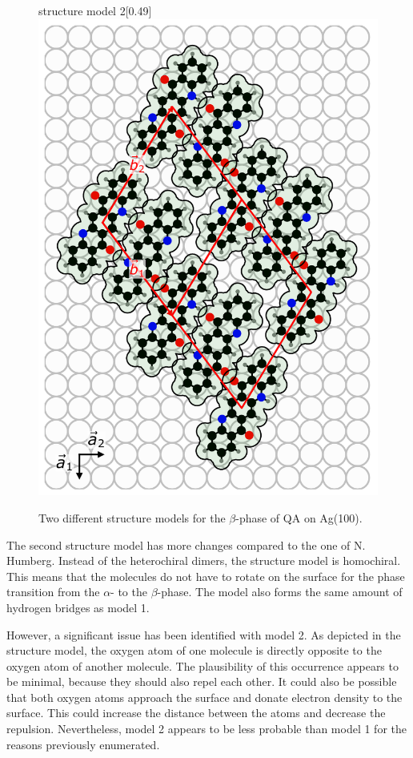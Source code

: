 \begin{figure}[htb]
\begin{subcaptionbox}{structure model 2}[0.49\linewidth]
		{\includegraphics[width=\linewidth]{images/QA-beta-Ag(100)-Version2.pdf}}
	\end{subcaptionbox}
	\caption{Two different structure models for the $\beta$-phase of \ac{QA} on Ag(100).}
	\label{fig:models}
\end{figure}

The second structure model has more changes compared to the one of N. Humberg.\autocite{Humberg2024} Instead of the heterochiral dimers, the structure model is homochiral. This means that the molecules do not have to rotate on the surface for the phase transition from the $\alpha$- to the $\beta$-phase. The model also forms the same amount of hydrogen bridges as model 1.

However, a significant issue has been identified with model 2. As depicted in the structure model, the oxygen atom of one molecule is directly opposite to the oxygen atom of another molecule. The plausibility of this occurrence appears to be minimal, because they should also repel each other. It could also be possible that both oxygen atoms approach the surface and donate electron density to the surface. This could increase the distance between the atoms and decrease the repulsion. Nevertheless, model 2 appears to be less probable than model 1 for the reasons previously enumerated.

\cleardoublepage

